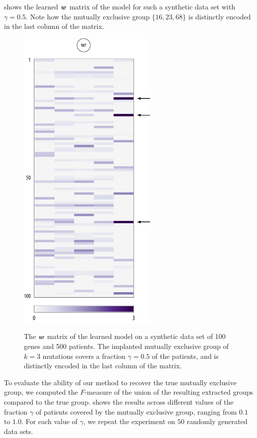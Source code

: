  shows the learned $\bm{w}$ matrix of the \fldc{} model for such a synthetic data set with $\gamma = 0.5$.
Note how the mutually exclusive group $\{16, 23, 68\}$ is distinctly encoded in the last column of the matrix.

\begin{figure}[p]
\centering
\includegraphics[width=0.6\textwidth]{figures/genes/mat_syn.pdf}\\[1em]
\caption{The $\bm{w}$ matrix of the learned \fldc{} model on a synthetic data set of 100 genes and 500 patients.
The implanted mutually exclusive group of $k = 3$ mutations covers a fraction $\gamma = 0.5$ of the patients, and is distinctly encoded in the last column of the matrix.}
\label{fig:syn_mat}
\end{figure}

To evaluate the ability of our method to recover the true mutually exclusive group, we computed the $F$-measure of the union of the resulting extracted groups compared to the true group.
 shows the results across different values of the fraction $\gamma$ of patients covered by the mutually exclusive group, ranging from $0.1$ to $1.0$.
For each value of $\gamma$, we repeat the experiment on $50$ randomly generated data sets.

